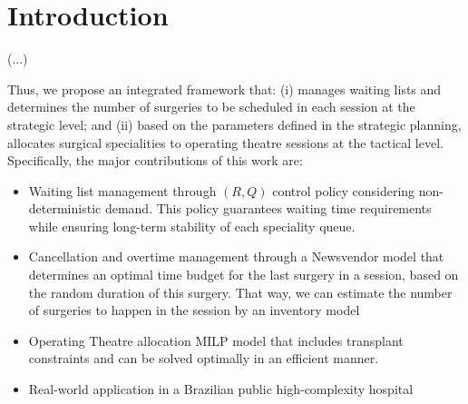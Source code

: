 \documentclass[review,3p,authoryear]{elsarticle}
\begin{document}
\begin{frontmatter}
\begin{abstract}
Abstract text.
\end{abstract}



\begin{keyword}



\end{keyword}

\end{frontmatter}


\section{Introduction\label{sec:intro}}

(...)

Thus, we propose an integrated framework that: (i) manages waiting lists and determines the number of surgeries to be scheduled in each session at the strategic level; and (ii) based on the parameters defined in the strategic planning, allocates surgical specialities to operating theatre sessions at the tactical level.
Specifically, the major contributions of this work are:
\begin{itemize}
    \item Waiting list management through $(R,Q)$ control policy considering non-deterministic demand. This policy guarantees waiting time requirements while ensuring long-term stability of each speciality queue.
    \item Cancellation and overtime management through a Newsvendor model that determines an optimal time budget for the last surgery in a session, based on the random duration of this surgery. That way, we can estimate the number of surgeries to happen in the session by an inventory model
    \item Operating Theatre allocation MILP model that includes transplant constraints and can be solved optimally in an efficient manner.
    \item Real-world application in a Brazilian public high-complexity hospital
\end{itemize}
\end{document}
